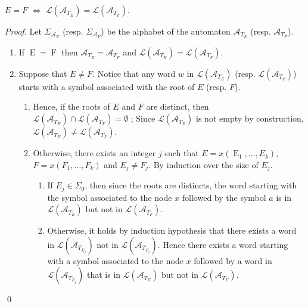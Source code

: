 \documentclass{llncs}
\DeclareMathOperator{\E}{E}
\DeclareMathOperator{\f}{F}
\begin{document}
\begin{lemma}\label{lem exp egal si lang eq}
$E=F$ $\Leftrightarrow$ $\mathcal{L}(\mathcal{A}_{T_E})=\mathcal{L}(\mathcal{A}_{T_F})$.
\end{lemma} 
\begin{proof}
  Let $\Sigma_{\mathcal{A}_E}$ (resp. $\Sigma_{\mathcal{A}_F}$) be the alphabet of the automaton $\mathcal{A}_{T_E}$ (resp. $\mathcal{A}_{T_F}$).
  
  \begin{enumerate}
    \item If $\E=\f$ then $\mathcal{A}_{T_E}=\mathcal{A}_{T_F}$ and $\mathcal{L}(\mathcal{A}_{T_E})=\mathcal{L}(\mathcal{A}_{T_F})$.
    \item Suppose that $E\neq F$.  Notice that any word $w$ in $\mathcal{L}(\mathcal{A}_{T_E})$ (resp. $\mathcal{L}(\mathcal{A}_{T_F})$) starts with a symbol associated with the root of $E$ (resp. $F$). 
    \begin{enumerate}
      \item Hence, if the roots of $E$ and $F$ are distinct, then $\mathcal{L}(\mathcal{A}_{T_E}) \cap \mathcal{L}(\mathcal{A}_{T_F})=\emptyset$ ; Since $\mathcal{L}(\mathcal{A}_{T_E})$ is not empty by construction, $\mathcal{L}(\mathcal{A}_{T_E}) \neq \mathcal{L}(\mathcal{A}_{T_F})$. 
      \item Otherwise, there exists an integer $j$ such that $E=x(\E_1,\ldots,E_k)$, $F=x(F_1,\ldots,F_k)$ and $E_j\neq F_j$. By induction over the size of $E_j$.
      \begin{enumerate}
        \item If $E_j\in\Sigma_0$, then since the roots are distincts, the word starting with the symbol associated to the node $x$ followed by the symbol $a$ is in $\mathcal{L}(\mathcal{A}_{T_{E}})$ but not in $\mathcal{L}(\mathcal{A}_{T_F})$.
        \item Otherwise, it holds by induction hypothesis that there exists a word in $\mathcal{L}(\mathcal{A}_{T_{E_j}})$ not in $\mathcal{L}(\mathcal{A}_{T_{F_j}})$. Hence there exists a word starting with a symbol associated to the node $x$ followed by a word in $\mathcal{L}(\mathcal{A}_{T_{E_j}})$ that is in $\mathcal{L}(\mathcal{A}_{T_E})$ but not in $\mathcal{L}(\mathcal{A}_{T_F})$.
      \end{enumerate}
    \end{enumerate}
  \end{enumerate}
  \qed
\end{proof}
\end{document}
